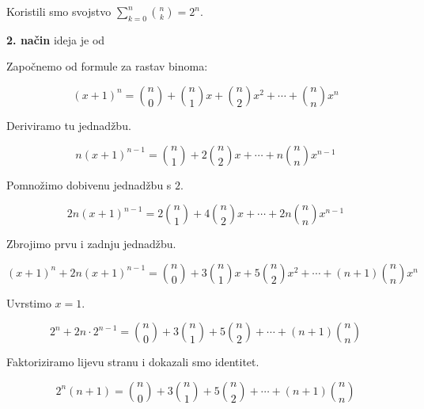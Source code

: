 \documentclass[exam.tex]{subfiles}
\begin{document}
	Koristili smo svojstvo \( \sum\limits^n_{k=0} \binom{n}{k} = 2^n \). 
	
	\newpage
	
	\textbf{2. način} ideja je od \UkiseljeniKrastavac
	
	Započnemo od formule za rastav binoma:
	
	\[ (x + 1)^n = \binom{n}{0} + \binom{n}{1} x + \binom{n}{2} x^2 + \cdots + \binom{n}{n} x^n \]
	
	Deriviramo tu jednadžbu.
	
	\[ n (x + 1)^{n - 1} = \binom{n}{1} + 2 \binom{n}{2} x + \cdots + n \binom{n}{n} x^{n - 1} \]
	
	Pomnožimo dobivenu jednadžbu s \( 2 \).
	
	\[ 2 n (x + 1)^{n - 1} = 2 \binom{n}{1} + 4 \binom{n}{2} x + \cdots + 2 n \binom{n}{n} x^{n - 1} \]
	
	Zbrojimo prvu i zadnju jednadžbu.
	
	\[ (x + 1)^n + 2 n (x + 1)^{n - 1} = \binom{n}{0} + 3 \binom{n}{1} x + 5 \binom{n}{2} x^2 + \cdots + (n + 1) \binom{n}{n} x^n \]
	
	Uvrstimo \( x = 1 \).
	
	\[ 2^n + 2 n \cdot 2^{n - 1} = \binom{n}{0} + 3 \binom{n}{1} + 5 \binom{n}{2} + \cdots + (n + 1) \binom{n}{n} \]
	
	Faktoriziramo lijevu stranu i dokazali smo identitet.
	
	\[ 2^n (n + 1) = \binom{n}{0} + 3 \binom{n}{1} + 5 \binom{n}{2} + \cdots + (n + 1) \binom{n}{n} \]
\end{document}
